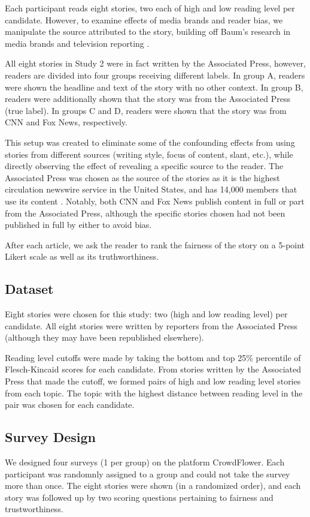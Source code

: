 Each participant reads eight stories, two each of high and low reading level per candidate. However, to examine effects of media brands and reader bias, we manipulate the source attributed to the story, building off Baum's research in media brands and television reporting \cite{baum2008eye}.

All eight stories in Study 2 were in fact written by the Associated Press, however, readers are divided into four groups receiving different labels. In group A, readers were shown the headline and text of the story with no other context. In group B, readers were additionally shown that the story was from the Associated Press (true label). In groups C and D, readers were shown that the story was from CNN and Fox News, respectively.

This setup was created to eliminate some of the confounding effects from using stories from different sources (writing style, focus of content, slant, etc.), while directly observing the effect of revealing a specific source to the reader. The Associated Press was chosen as the source of the stories as it is the highest circulation newswire service in the United States, and has 14,000 members that use its content \cite{apFAQ}. Notably, both CNN and Fox News publish content in full or part from the Associated Press, although the specific stories chosen had not been published in full by either to avoid bias.

After each article, we ask the reader to rank the fairness of the story on a 5-point Likert scale as well as its truthworthiness.

\subsection{Dataset} 
Eight stories were chosen for this study: two (high and low reading level) per candidate. All eight stories were written by reporters from the Associated Press (although they may have been republished elsewhere).

Reading level cutoffs were made by taking the bottom and top 25\% percentile of Flesch-Kincaid scores for each candidate. From stories written by the Associated Press that made the cutoff, we formed pairs of high and low reading level stories from each topic. The topic with the highest distance between reading level in the pair was chosen for each candidate.

 
\subsection{Survey Design}
We designed four surveys (1 per group) on the platform CrowdFlower. Each participant was randomnly assigned to a group and could not take the survey more than once. The eight stories were shown (in a randomized order), and each story was followed up by two scoring questions pertaining to fairness and trustworthiness.

